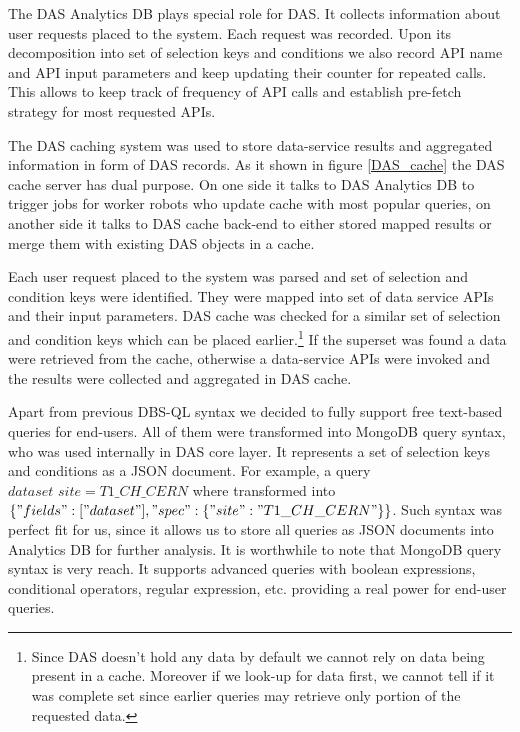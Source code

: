 \documentclass[a4paper]{jpconf}
\begin{document}
The DAS Analytics DB plays special role for DAS. It collects information
about user requests placed to the system. Each request was recorded. Upon its
decomposition into set of selection keys and conditions we also record
API name and API input parameters and keep updating their counter for repeated
calls. This allows to keep track of frequency of API calls and establish pre-fetch
strategy for most requested APIs.

The DAS caching system was used to store data-service results and aggregated
information in form of DAS records. As it shown in figure \ref{DAS_cache} 
the DAS cache server has dual purpose.
On one side it talks to DAS Analytics DB to trigger jobs for worker robots
who update cache with most popular queries, on another side it talks to DAS
cache back-end to either stored mapped results or merge them with 
existing DAS objects in a cache. 

Each user request placed to the system was parsed and set of selection
and condition keys were identified. They were mapped into set of
data service APIs and their input parameters. DAS
cache was checked for a similar set of selection and condition
keys which can be placed earlier.\footnote{Since DAS doesn't hold
any data by default we cannot rely on data being present in a cache.
Moreover if we look-up for data first, we cannot tell if it was complete
set since earlier queries may retrieve only portion of the requested data.}
If the superset was found a data were
retrieved from the cache, otherwise a data-service APIs were
invoked and the results were collected and aggregated in DAS cache.


Apart from previous DBS-QL syntax we decided to fully support free text-based queries for end-users.
All of them were transformed into MongoDB query syntax, who was used internally in
DAS core layer. It represents a set of selection keys and conditions as a JSON document.
For example, a query
$dataset\,\,site=T1\_CH\_CERN$
where transformed into 
$\{"fields" : ["dataset"], "spec" : \{ "site" :"T1\_CH\_CERN"\}\}$.
Such syntax was perfect fit for us, since it allows us to store all queries
as JSON documents into Analytics DB for further analysis. It is worthwhile to note that
MongoDB query syntax is very reach. It supports advanced queries with 
boolean expressions, conditional operators, regular expression, etc. providing
a real power for end-user queries.
\end{document}
